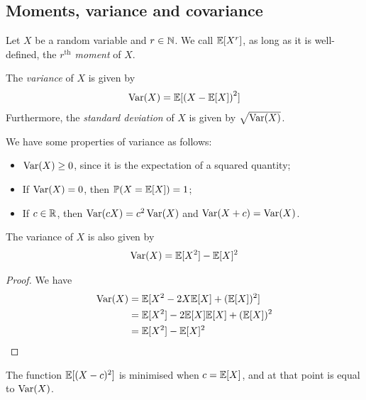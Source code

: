 \documentclass{../../template/note}
\begin{document}
    \subsection{Moments, variance and covariance}

    \begin{definition}
        Let \(X\) be a random variable and \(r \in \mathbb N\). We call \(\mathbb E[X^r]\), as long as it is well-defined, the \emph{\(r^\text{th}\) moment} of \(X\).
    \end{definition}
    
    \begin{definition}
        The \emph{variance} of \(X\) is given by
        \begin{align*}
            \operatorname{Var}(X) = \mathbb E[\left(X-\mathbb E[X]\right)^2]
        \end{align*}
        Furthermore, the \emph{standard deviation} of \(X\) is given by \(\sqrt{\operatorname{Var}(X)}\).        
    \end{definition}
    
    We have some properties of variance as follows:
    \begin{itemize}
        \item \(\operatorname{Var}(X) \geq 0\), since it is the expectation of a squared quantity;
        \item If \(\operatorname{Var}(X) = 0\), then \(\mathbb P(X = \mathbb E[X]) = 1\);
        \item If \(c \in \mathbb R\), then \(\operatorname{Var}(cX) = c^2\operatorname{Var}(X)\) and \(\operatorname{Var}(X + c) = \operatorname{Var}(X)\).
    \end{itemize}
    
    \begin{lemma}
        The variance of \(X\) is also given by
        \begin{align*}
            \operatorname{Var}(X) = \mathbb E[X^2] - \mathbb E[X]^2
        \end{align*}
    \end{lemma}
    
    \begin{proof}
        We have
        \begin{align*}
            \operatorname{Var}(X) &= \mathbb E[X^2 - 2X\mathbb E[X] + (\mathbb E[X])^2] \\
            &= \mathbb E[X^2] - 2\mathbb E[X]\mathbb E[X] + (\mathbb E[X])^2 \\
            &= \mathbb E[X^2] - \mathbb E[X]^2
        \end{align*}
    \end{proof}
    
    \begin{lemma}
        The function \(\mathbb E[(X-c)^2]\) is minimised when \(c=\mathbb E[X]\), and at that point is equal to \(\operatorname{Var}(X)\).
    \end{lemma}
    
\end{document}
